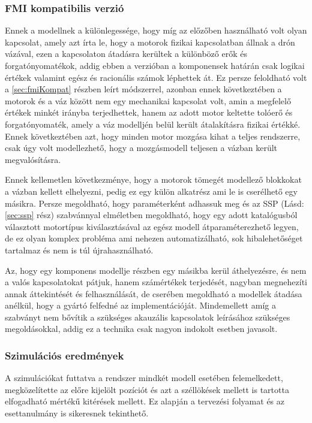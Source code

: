         \subsubsection{FMI kompatibilis verzió}
        Ennek a modellnek a különlegessége, hogy míg az előzőben használható volt olyan kapcsolat, amely azt írta le, hogy a motorok fizikai kapcsolatban állnak a drón vázával, ezen a kapcsolaton átadásra kerültek a különböző erők és forgatónyomatékok, addig ebben a verzióban a komponensek határán csak logikai értékek valamint egész és racionális számok léphettek át.
        Ez persze feloldható volt a \ref{sec:fmiKompat} részben leírt módszerrel, azonban ennek következtében a motorok és a váz között nem egy mechanikai kapcsolat volt, amin a megfelelő értékek minkét irányba terjedhettek, hanem az adott motor keltette tolóerő és forgatónyomaték, amely a váz modelljén belül került átalakításra fizikai értékké. Ennek következtében azt, hogy minden motor mozgása kihat a teljes rendszerre, csak úgy volt modellezhető, hogy a mozgásmodell teljesen a vázban került megvalósításra.

        Ennek kellemetlen következménye, hogy a motorok tömegét modellező blokkokat a vázban kellett elhelyezni, pedig ez egy külön alkatrész ami le is cserélhető egy másikra. Persze megoldható, hogy paraméterként adhassuk meg és az SSP (Lásd: \ref{sec:ssp} rész) szabvánnyal elméletben megoldható, hogy egy adott katalógusból választott motortípus kiválasztásával az egész modell átparaméterezhető legyen, de ez olyan komplex probléma ami nehezen automatizálható, sok hibalehetőséget tartalmaz és nem is túl újrahasználható.

        Az, hogy egy komponens modellje részben egy másikba kerül áthelyezésre, és nem a valós kapcsolatokat pátjuk, hanem számértékek terjedését, nagyban megnehezíti annak áttekintését és felhasználását, de cserében megoldható a modellek átadása anélkül, hogy a gyártó felfedné az implementációját.
        Mindemellett amíg a szabványt nem bővítik a szükséges akauzális kapcsolatok leírásához szükséges megoldásokkal, addig ez a technika csak nagyon indokolt esetben javasolt.

        \subsubsection{Szimulációs eredmények}
        A szimulációkat futtatva a rendszer mindkét modell esetében felemelkedett, megközelítette az előre kijelölt pozíciót és azt a széllökések mellett is tartotta elfogadható mértékű kitérések mellett.
        Ez alapján a tervezési folyamat és az esettanulmány is sikeresnek tekinthető.